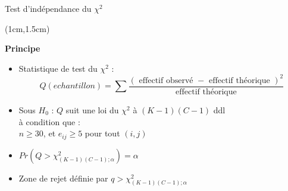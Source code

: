 \documentclass{beamer}
\begin{document}
\begin{frame}{Test d'indépendance du $\chi^2$}
\begin{textblock*}{\textwidth}(1cm,1.5cm)

\begin{center}{\bf \Large Principe} \end{center}
\begin{itemize}
\item Statistique de test du $\chi^2$ :
$$
Q(echantillon)=\sum\frac{ ({\mbox { effectif observé }} -  {\mbox { effectif théorique }})^2}  { {\mbox { effectif théorique }}}$$

\item Sous $H_0$ : $Q$ suit une loi du $\chi^2$ à $(K-1)(C-1)$ ddl\\
à condition que : \\
$n\geq 30$, et $e_{ij} \geq 5$ pour tout $(i,j)$

\item $Pr(Q > \chi^2_{(K-1)(C-1) ; \alpha} ) = \alpha$ \\
 
\item Zone de rejet définie par $q > \chi^2_{(K-1)(C-1) ; \alpha}$ \\

\end{itemize}

\end{textblock*}

\end{frame}


\end{document}
